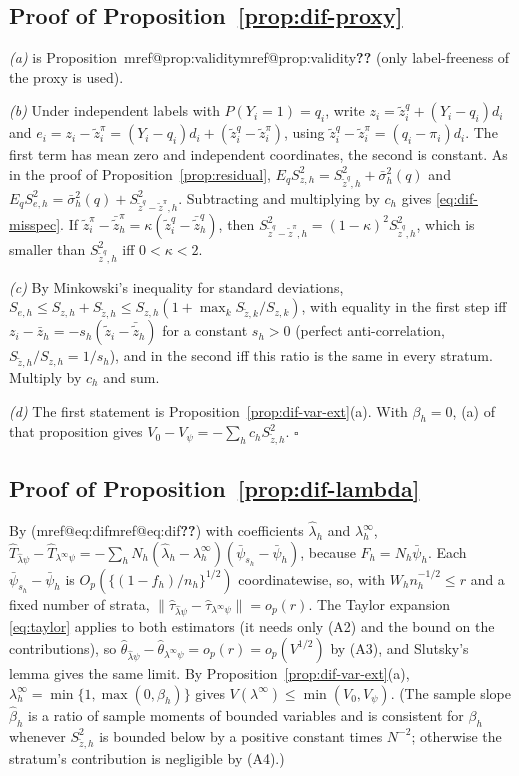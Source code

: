 \documentclass[pdflatex,sn-mathphys-num,iicol]{sn-jnl}
\makeatletter
\theoremstyle{thmstyleone}
\theoremstyle{thmstyletwo}
\theoremstyle{thmstylethree}
\newcommand{\Mref}[1]{\ifcsname mref@#1\endcsname\csname mref@#1\endcsname\else\textbf{??}\fi}
\makeatother
\begin{document}
\subsection{Proof of Proposition~\ref{prop:dif-proxy}}

\emph{(a)} is Proposition~\Mref{prop:validity} (only label-freeness of the proxy is used).

\emph{(b)} Under independent labels with $P(Y_i=1)=q_i$, write $z_i=\tilde z^q_i+(Y_i-q_i)d_i$ and $e_i=z_i-\tilde z^\pi_i=(Y_i-q_i)d_i+(\tilde z^q_i-\tilde z^\pi_i)$, using $\tilde z^q_i-\tilde z^\pi_i=(q_i-\pi_i)d_i$. The first term has mean zero and independent coordinates, the second is constant. As in the proof of
Proposition~\ref{prop:residual}, $E_qS^2_{z,h}=S^2_{\tilde z^q,h}+\bar\sigma^2_h(q)$ and $E_qS^2_{e,h}=\bar\sigma^2_h(q)+S^2_{\tilde z^q-\tilde z^\pi,h}$. Subtracting and multiplying by $c_h$ gives \eqref{eq:dif-misspec}.
If $\tilde z^\pi_i-\bar{\tilde z}^\pi_h=\kappa(\tilde z^q_i-\bar{\tilde z}^q_h)$, then $S^2_{\tilde z^q-\tilde z^\pi,h}=(1-\kappa)^2S^2_{\tilde z^q,h}$, which is smaller than $S^2_{\tilde z^q,h}$ iff $0<\kappa<2$.

\emph{(c)} By Minkowski's inequality for standard deviations, $S_{e,h}\le S_{z,h}+S_{\tilde z,h}\le S_{z,h}(1+\max_kS_{\tilde z,k}/S_{z,k})$, with equality in the first step iff $z_i-\bar z_h=-s_h(\tilde z_i-\bar{\tilde z}_h)$ for a constant $s_h>0$ (perfect anti-correlation, $S_{\tilde z,h}/S_{z,h}=1/s_h$), and in the second iff this ratio is the same in every stratum. Multiply by $c_h$ and sum.

\emph{(d)} The first statement is Proposition~\ref{prop:dif-var-ext}(a). With $\beta_h=0$, (a) of that proposition gives $V_0-V_\psi=-\sum_hc_hS^2_{\tilde z,h}$. $\square$

\subsection{Proof of Proposition~\ref{prop:dif-lambda}}

By (\Mref{eq:dif}) with coefficients $\hat\lambda_h$ and $\lambda_h^\infty$, $\hat T_{\hat\lambda\psi}-\hat T_{\lambda^\infty\psi}=-\sum_hN_h(\hat\lambda_h-\lambda^\infty_h)(\bar\psi_{s_h}-\bar\psi_h)$, because $F_h=N_h\bar\psi_h$.
Each $\bar\psi_{s_h}-\bar\psi_h$ is $O_p(\{(1-f_h)/n_h\}^{1/2})$ coordinatewise, so, with $W_hn_h^{-1/2}\le r$ and a fixed number of strata,
$\|\hat\tau_{\hat\lambda\psi}-\hat\tau_{\lambda^\infty\psi}\|=o_p(r)$. The Taylor expansion \eqref{eq:taylor} applies to both estimators (it needs only (A2) and the bound on the contributions), so
$\hat\theta_{\hat\lambda\psi}-\hat\theta_{\lambda^\infty\psi}=o_p(r)=o_p(V^{1/2})$ by (A3), and Slutsky's lemma gives the same limit. By Proposition~\ref{prop:dif-var-ext}(a), $\lambda^\infty_h=\min\{1,\max(0,\beta_h)\}$ gives
$V(\lambda^\infty)\le\min(V_0,V_\psi)$. (The sample slope $\hat\beta_h$ is a ratio of sample moments of bounded variables and is consistent for $\beta_h$ whenever $S^2_{\tilde z,h}$ is bounded below by a positive constant
times $N^{-2}$; otherwise the stratum's contribution is negligible by (A4).)
\end{document}
